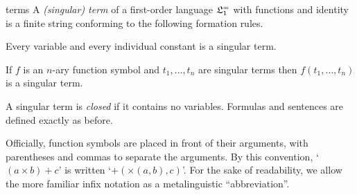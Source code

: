 \begin{definition}{}{terms}
  A \emph{(singular) term} of a first-order language $\mathfrak{L}_{1}^{=}$ with functions and identity is a finite string conforming to the following formation rules.
  \begin{cenumerate}
    \item[(i)] Every variable and every individual constant is a singular term.
    \item[(ii)] If $f$ is an $n$-ary function symbol and $t_1,\ldots,t_n$ are singular terms then $f(t_1,\ldots,t_n)$ is a singular term.
  \end{cenumerate}
\end{definition}
%
A singular term is \emph{closed} if it contains no variables.
Formulas and sentences are defined exactly as before.



Officially,
function symbols are placed in front of their arguments,
with parentheses and commas to separate the arguments.
By this convention,
`$(a \times b) + c$' is written `$+(\times(a,b),c)$'.
For the sake of readability,
we allow the more familiar infix notation as a metalinguistic ``abbreviation''.


